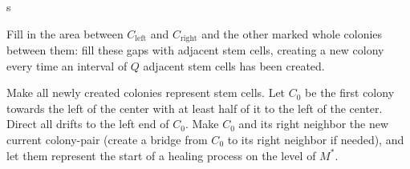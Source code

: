 \documentclass[11pt]{memoir}
\theoremstyle{definition} %
\newcommand{\Q}{Q} %
\newcommand{\Left}{\text{left}}
\newcommand{\Right}{\text{right}}
\begin{document}
\begin{varenum}{s}
\item Fill in the area between \( C_{\Left} \) and \( C_{\Right} \)
  and the other marked whole colonies between them:
  fill these gaps with adjacent stem cells, creating a new colony every time
  an interval of \( \Q \) adjacent stem cells has been created.

\item Make all newly created colonies represent stem cells.
  Let \( C_{0} \) be the first colony towards the left of the center
  with at least half of it to the left of the center.
  Direct all drifts to the left end of \( C_{0} \).
  Make \( C_{0} \) and its right neighbor the new current colony-pair (create a bridge from
  \( C_{0} \) to its right neighbor if needed), and let them
  represent the start of a healing process on the level of \( M^{*} \).
\end{varenum}
\end{document}
